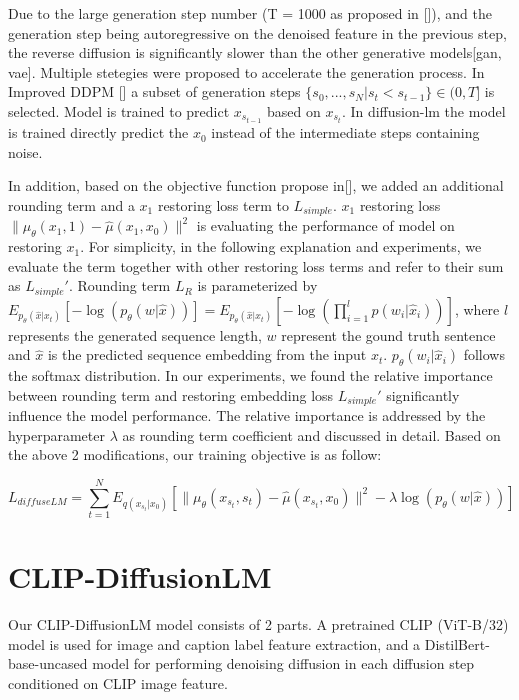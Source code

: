\documentclass{article}
\begin{document}
Due to the large generation step number (T = 1000 as proposed in []), and the generation step being autoregressive on the denoised feature in the previous step, the reverse diffusion is significantly slower than the other generative models[gan, vae]. Multiple stetegies were proposed to accelerate the generation process. In Improved DDPM [] a subset of generation steps $\{s_0, ..., s_N | s_t < s_{t-1}\} \in (0, T]$ is selected. Model is trained to predict $x_{s_{t-1}}$ based on $x_{s_t}$. In diffusion-lm the model is trained directly predict the $x_0$ instead of the intermediate steps containing noise.

In addition, based on the objective function propose in[], we added an additional rounding term and a $x_1$ restoring loss term to $L_{simple}$. $x_1$ restoring loss $\|\mu_{\theta}(x_1, 1) - \hat{\mu}(x_1, x_0)\|^2$ is evaluating the performance of model on restoring $x_1$. For simplicity, in the following explanation and experiments, we evaluate the term together with other restoring loss terms and refer to their sum as $L_{simple}'$. Rounding term $L_R$ is parameterized by $E_{p_{\theta}(\hat{x} | x_t)}[-\log(p_{\theta}(w | \hat{x}))] = E_{p_{\theta}(\hat{x} | x_t)}[-\log(\prod_{i=1}^l p(w_i | \hat{x}_i))]$, where $l$ represents the generated sequence length, $w$ represent the gound truth sentence and $\hat{x}$ is the predicted sequence embedding from the input $x_t$. $p_{\theta}(w_i | \hat{x}_i)$ follows the softmax distribution. In our experiments, we found the relative importance between rounding term and restoring embedding loss $L_{simple}'$ significantly influence the model performance. The relative importance is addressed by the hyperparameter $\lambda$ as rounding term coefficient and discussed in detail{}. Based on the above 2 modifications, our training objective is as follow:

$$L_{diffuseLM} = \sum_{t=1}^{N} E_{q(x_{s_t} | x_0)} [\|\mu_{\theta}(x_{s_t}, s_t) - \hat{\mu}(x_{s_t}, x_0)\|^2 -\lambda\log(p_{\theta}(w | \hat{x}))]$$


\section{CLIP-DiffusionLM}
Our CLIP-DiffusionLM model consists of 2 parts. A pretrained CLIP (ViT-B/32) model is used for image and caption label feature extraction, and a DistilBert-base-uncased model for performing denoising diffusion in each diffusion step conditioned on CLIP image feature.
\end{document}
